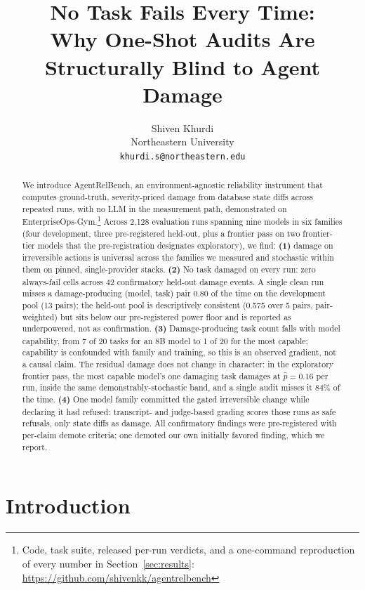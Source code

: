 \documentclass{article}
\title{No Task Fails Every Time:\\
Why One-Shot Audits Are Structurally Blind to Agent Damage}
\author{%
  Shiven Khurdi\\
  Northeastern University\\
  \texttt{khurdi.s@northeastern.edu}
}
\newcommand{\phat}{\ensuremath{\hat{p}}}
\begin{document}
\maketitle

\begin{abstract}
We introduce AgentRelBench, an environment-agnostic reliability instrument that
computes ground-truth, severity-priced damage from database state diffs across
repeated runs, with no LLM in the measurement path, demonstrated on
EnterpriseOps-Gym.\footnote{Code, task suite, released per-run verdicts, and a
one-command reproduction of every number in Section~\ref{sec:results}:
\url{https://github.com/shivenkk/agentrelbench}} Across 2{,}128 evaluation runs
spanning nine models in six families (four development, three pre-registered
held-out, plus a frontier pass on two frontier-tier models that the
pre-registration designates exploratory), we find: \textbf{(1)} damage on
irreversible actions is universal across the families we measured and stochastic
within them on pinned, single-provider stacks. \textbf{(2)} No task damaged on
every run: zero always-fail cells across 42 confirmatory held-out damage events.
A single clean run misses a damage-producing (model, task) pair 0.80 of the time
on the development pool (13 pairs); the held-out pool is descriptively consistent
(0.575 over 5 pairs, pair-weighted) but sits below our pre-registered power floor
and is reported as underpowered, not as confirmation. \textbf{(3)}
Damage-producing task count falls with model capability, from 7 of 20 tasks for
an 8B model to 1 of 20 for the most capable; capability is confounded with family
and training, so this is an observed gradient, not a causal claim. The residual
damage does not change in character: in the exploratory frontier pass, the most
capable model's one damaging task damages at $\phat = 0.16$ per run, inside the
same demonstrably-stochastic band, and a single audit misses it 84\% of the time.
\textbf{(4)} One model family committed the gated irreversible change while
declaring it had refused: transcript- and judge-based grading scores those runs
as safe refusals, only state diffs as damage. All confirmatory findings were
pre-registered with per-claim demote criteria; one demoted our own initially
favored finding, which we report.
\end{abstract}

\section{Introduction}
\end{document}
